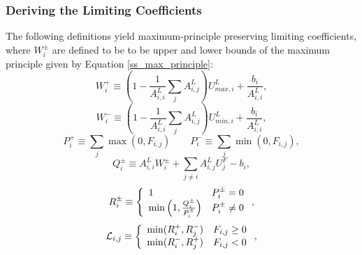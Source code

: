 \subsubsection{Deriving the Limiting Coefficients}
\begin{lemma}\label{ss_coef}
   The following definitions yield maximum-principle preserving limiting coefficients,
   where $W_i^\pm$ are defined to be to be upper and lower bounds of the maximum
   principle given by Equation \ref{ss_max_principle}:
   \begin{equation}
      W_i^+ \equiv  \left(1 - \frac{1}{A^L_{i,i}}\sum\limits_j A^L_{i,j}\right)U_{max,i}^L
      + \frac{b_i}{A^L_{i,i}},
   \end{equation}
   \begin{equation}
      W_i^- \equiv  \left(1 - \frac{1}{A^L_{i,i}}\sum\limits_j A^L_{i,j}\right)U_{min,i}^L
      + \frac{b_i}{A^L_{i,i}},
   \end{equation}
   \begin{equation}\label{P_defs}
      P_i^+ \equiv \sum\limits_j\max(0,F_{i,j}) \qquad
      P_i^- \equiv \sum\limits_j\min(0,F_{i,j}),
   \end{equation}
   \begin{equation}
      Q_i^\pm \equiv A_{i,i}^L W_i^\pm + \sum\limits_{j\ne i} A_{i,j}^L U_j^F - b_i,
   \end{equation}
   \begin{equation}\label{R_defs}
      R_i^\pm \equiv\left\{
         \begin{array}{l l}
            1                                          & P_i^\pm = 0\\
            \min\left(1,\frac{Q_i^\pm}{P_i^\pm}\right) & P_i^\pm \ne 0
         \end{array}
         \right.,
   \end{equation}
   \begin{equation}\label{L_defs}
      \mathcal{L}_{i,j} \equiv\left\{
         \begin{array}{l l}
            \min(R_i^+,R_j^-) & F_{i,j} \geq 0\\
            \min(R_i^-,R_j^+) & F_{i,j} < 0
         \end{array}
         \right.,
   \end{equation}   
\end{lemma}

